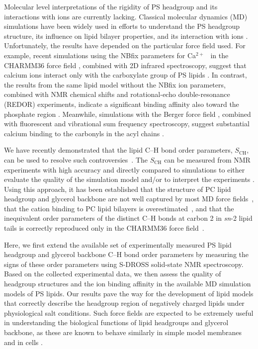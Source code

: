 \documentclass[journal=jpcbfk,manuscript=article]{achemso}
\begin{document}
Molecular level interpretations of the rigidity of PS headgroup and its interactions with ions
are currently lacking. Classical molecular dynamics (MD) simulations have been widely used in efforts 
to understand the PS headgroup structure, its influence on lipid bilayer properties, and its
interaction with
ions \cite{cascales96,pandit02,mukhopadhyay04,pedersen06,vernier09,boettcher11,molina12,jurkiewicz12,venable13,pan14,vangaveti14,melcrova16,valentine18,hallock18}.
Unfortunately, the results have depended on the particular force field used.
For example, recent simulations using the NBfix parameters for Ca$^{2+}$~\cite{kim16} in
the CHARMM36 force field \cite{klauda10,venable13}, combined with 2D infrared spectroscopy,
suggest that calcium ions interact only with the carboxylate group of PS lipids \cite{valentine18}. In contrast,
the results from the same lipid model without the NBfix ion parameters, combined with NMR chemical shifts and
rotational-echo double-resonance (REDOR) experiments, indicate a significant binding affinity also toward the phosphate region \cite{hallock18}.
Meanwhile, simulations with the Berger force field \cite{berger97,mukhopadhyay04},
combined with fluorescent and vibrational sum frequency spectroscopy, suggest substantial
calcium binding to the carbonyls in the acyl chains \cite{melcrova16}.

We have recently demonstrated that the lipid C--H bond order parameters, $S_\mathrm{CH}$,
can be used to resolve such controversies~\cite{botan15,catte16}. The $S_\mathrm{CH}$ can be
measured from NMR experiments with high accuracy and directly compared to simulations
to either evaluate the quality of the simulation model and/or to interpret the experiments \cite{ollila16}. Using this approach,
it has been established that the structure of PC lipid headgroup and glycerol backbone are not well
captured by most MD force fields~\cite{botan15}, that the cation binding to PC
lipid bilayers is overestimated~\cite{catte16}, and that the inequivalent order parameters of the distinct C--H bonds at
carbon 2 in {\it sn}-2 lipid tails is correctly reproduced only in the CHARMM36 force field~\cite{piggot17}.

Here, we first extend the available set of experimentally measured PS lipid headgroup and
glycerol backbone C--H bond order parameters
by measuring the signs of these order parameters using S-DROSS solid-state NMR spectroscopy.
Based on the collected experimental data, we then assess
the quality of headgroup structures and the ion binding affinity in
the available MD simulation models of PS lipids.
Our results pave the way
for the development of lipid models that correctly describe 
the headgroup region of negatively charged lipids under physiological salt
conditions. Such force fields are expected to be extremely useful in understanding
the biological functions of lipid headgroups and glycerol backbone, as
these are known to behave similarly in simple model membranes and in cells \cite{gally81,scherer87,seelig90}.
\end{document}
